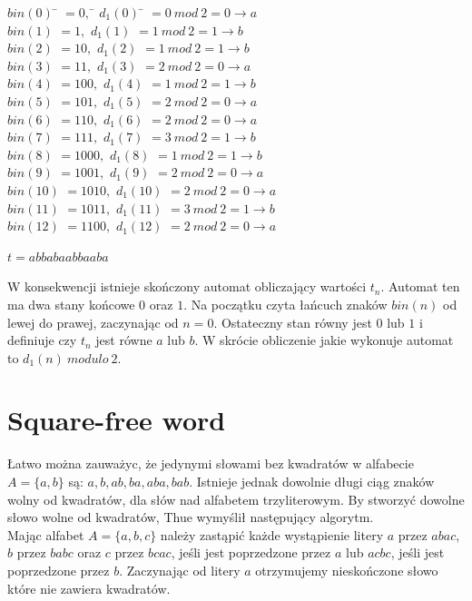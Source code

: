 \documentclass[document]{xmgr}
\begin{document}
\begin{tabbing}
$bin(0)$\hspace{1em} \= $= 0,$\hspace{7em} \= $d_1 (0)$\hspace{1em} \= $= 0\ mod\ 2 = 0 \to a$ \\
$bin(1)$ \> $= 1,$ \> $d_1 (1)$ \> $= 1\ mod\ 2 = 1 \to b$\\
$bin(2)$ \> $= 10,$ \> $d_1 (2)$ \> $= 1\ mod\ 2 = 1 \to b$\\
$bin(3)$ \> $= 11,$ \> $d_1 (3)$ \> $= 2\ mod\ 2 = 0 \to a$\\
$bin(4)$ \> $= 100,$ \> $d_1 (4)$ \> $= 1\ mod\ 2 = 1 \to b$\\
$bin(5)$ \> $= 101,$ \> $d_1 (5)$ \> $= 2\ mod\ 2 = 0 \to a$\\
$bin(6)$ \> $= 110,$ \> $d_1 (6)$ \> $= 2\ mod\ 2 = 0 \to a$\\
$bin(7)$ \> $= 111,$ \> $d_1 (7)$ \> $= 3\ mod\ 2 = 1 \to b$\\
$bin(8)$ \> $= 1000,$ \> $d_1 (8)$ \> $= 1\ mod\ 2 = 1 \to b$\\
$bin(9)$ \> $= 1001,$ \> $d_1 (9)$ \> $= 2\ mod\ 2 = 0 \to a$\\
$bin(10)$ \> $= 1010,$	\> $d_1 (10)$ \> $= 2\ mod\ 2 = 0 \to a$\\
$bin(11)$ \> $= 1011,$ 	\> $d_1 (11)$ \> $= 3\ mod\ 2 = 1 \to b$\\
$bin(12)$ \> $= 1100,$ 	\> $d_1 (12)$ \> $= 2\ mod\ 2 = 0 \to a$
\end{tabbing}

{\centering $t = abbabaabbaaba$ \par}

W konsekwencji istnieje skończony automat obliczający wartości $t_n$. Automat ten ma dwa stany końcowe $0$ oraz $1$. Na początku czyta łańcuch znaków $bin(n)$ od lewej do prawej, zaczynając od $n=0$. Ostateczny stan równy jest $0$ lub $1$ i definiuje czy $t_n$ jest równe $a$ lub $b$. W skrócie obliczenie jakie wykonuje automat to $d_1(n)\ modulo\ 2$.


\section{Square-free word}
Łatwo można zauważyc, że jedynymi słowami bez kwadratów w alfabecie $A = \{a, b\}$ są: $a, b, ab, ba, aba, bab$. Istnieje jednak dowolnie długi ciąg znaków wolny od kwadratów, dla słów nad alfabetem trzyliterowym. By stworzyć dowolne słowo wolne od kwadratów, Thue wymyślił następujący algorytm.\\
Mając alfabet $A = \{a, b, c\}$ należy zastąpić każde wystąpienie litery $a$ przez $abac$,  $b$ przez $babc$ oraz $c$ przez $bcac$, jeśli jest poprzedzone przez $a$ lub $acbc$, jeśli jest poprzedzone przez $b$. Zaczynając od litery $a$ otrzymujemy nieskończone słowo które nie zawiera kwadratów.
\end{document}
